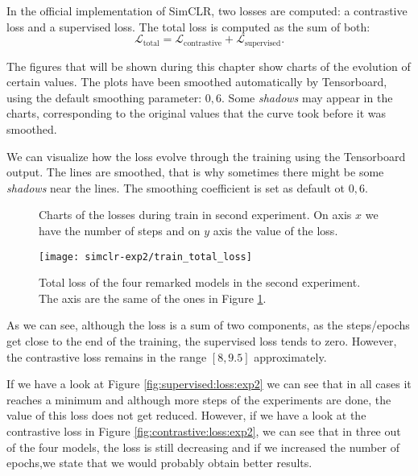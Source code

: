     In the official implementation of SimCLR, two losses are computed: a contrastive loss and a supervised loss. The total loss is computed as the sum of both:
    \[
    \mathcal L_{\operatorname{total}} = \mathcal L_{\operatorname{contrastive} }+ \mathcal L_{\operatorname{supervised}}.    
    \]

\begin{remark}
The figures that will be shown during this chapter show charts of the evolution of certain values. The plots have been smoothed automatically by Tensorboard, using the default smoothing parameter: $0,6$. Some \emph{shadows} may appear in the charts, corresponding to the original values that the curve took before it was smoothed.
\end{remark}

    We can visualize how the loss evolve through the training using the Tensorboard output. The lines are smoothed, that is why sometimes there might be some \emph{shadows} near the lines. The smoothing coefficient is set as default ot $0,6$. 
    \begin{figure}[htp] 
        \centering
        \hfill%
            \caption{Charts of the losses during train in second experiment. On axis $x$ we have the number of steps and on $y$ axis the value of the loss.}
            \label{fig:exp2:both:losses}
    \end{figure}


\begin{figure}[H]
\centering
\texttt{[image: simclr-exp2/train\_total\_loss]}%
\caption{Total loss of the four remarked models in the second experiment. The axis are the same of the ones in Figure \ref{fig:exp2:both:losses}. }
\label{fig:total:loss:exp2}%
\end{figure}

As we can see, although the loss is a sum of two components, as the steps/epochs get close to the end of the training, the supervised loss tends to zero. However, the contrastive loss remains in the range $[8,9.5]$ approximately. 

If we have a look at Figure \ref{fig:supervised:loss:exp2} we can see that in all cases it reaches a minimum and although more steps of the experiments are done, the value of this loss does not get reduced. However, if we have a look at the contrastive loss in Figure \ref{fig:contrastive:loss:exp2}, we can see that in three out of the four models, the loss is still decreasing and if we increased the number of epochs,we state that we would probably obtain better results.

